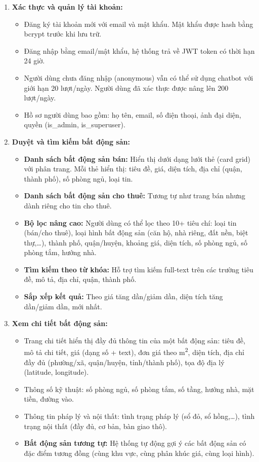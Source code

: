 \begin{enumerate}
    \item \textbf{Xác thực và quản lý tài khoản:}
    \begin{itemize}
        \item Đăng ký tài khoản mới với email và mật khẩu. Mật khẩu được hash bằng bcrypt trước khi lưu trữ.
        \item Đăng nhập bằng email/mật khẩu, hệ thống trả về JWT token có thời hạn 24 giờ.
        \item Người dùng chưa đăng nhập (anonymous) vẫn có thể sử dụng chatbot với giới hạn 20 lượt/ngày. Người dùng đã xác thực được nâng lên 200 lượt/ngày.
        \item Hồ sơ người dùng bao gồm: họ tên, email, số điện thoại, ảnh đại diện, quyền (is\_admin, is\_superuser).
    \end{itemize}

    \item \textbf{Duyệt và tìm kiếm bất động sản:}
    \begin{itemize}
        \item \textbf{Danh sách bất động sản bán:} Hiển thị dưới dạng lưới thẻ (card grid) với phân trang. Mỗi thẻ hiển thị: tiêu đề, giá, diện tích, địa chỉ (quận, thành phố), số phòng ngủ, loại tin.
        \item \textbf{Danh sách bất động sản cho thuê:} Tương tự như trang bán nhưng dành riêng cho tin cho thuê.
        \item \textbf{Bộ lọc nâng cao:} Người dùng có thể lọc theo 10+ tiêu chí: loại tin (bán/cho thuê), loại hình bất động sản (căn hộ, nhà riêng, đất nền, biệt thự,\dots), thành phố, quận/huyện, khoảng giá, diện tích, số phòng ngủ, số phòng tắm, hướng nhà.
        \item \textbf{Tìm kiếm theo từ khóa:} Hỗ trợ tìm kiếm full-text trên các trường tiêu đề, mô tả, địa chỉ, quận, thành phố.
        \item \textbf{Sắp xếp kết quả:} Theo giá tăng dần/giảm dần, diện tích tăng dần/giảm dần, mới nhất.
    \end{itemize}

    \item \textbf{Xem chi tiết bất động sản:}
    \begin{itemize}
        \item Trang chi tiết hiển thị đầy đủ thông tin của một bất động sản: tiêu đề, mô tả chi tiết, giá (dạng số + text), đơn giá theo m\textsuperscript{2}, diện tích, địa chỉ đầy đủ (phường/xã, quận/huyện, tỉnh/thành phố), tọa độ địa lý (latitude, longitude).
        \item Thông số kỹ thuật: số phòng ngủ, số phòng tắm, số tầng, hướng nhà, mặt tiền, đường vào.
        \item Thông tin pháp lý và nội thất: tình trạng pháp lý (sổ đỏ, sổ hồng,\dots), tình trạng nội thất (đầy đủ, cơ bản, bàn giao thô).
        \item \textbf{Bất động sản tương tự:} Hệ thống tự động gợi ý các bất động sản có đặc điểm tương đồng (cùng khu vực, cùng phân khúc giá, cùng loại hình).
    \end{itemize}


\end{enumerate}
